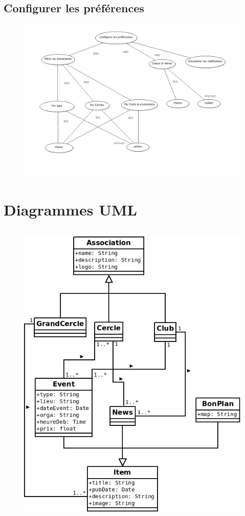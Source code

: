 \documentclass[a4paper, 11px]{article}
\begin{document}
\subsection{Configurer les préférences}
\begin{figure}[h]
\includegraphics[width = \textwidth]{configurer_preferences.png}
\end{figure}
\vfill
\clearpage

\section{Diagrammes UML}
\vfill
\begin{figure}[h!]
\includegraphics[width = 20cm,height=15cm]{classes.png}
\end{figure}
\vfill
\clearpage
\end{document}
